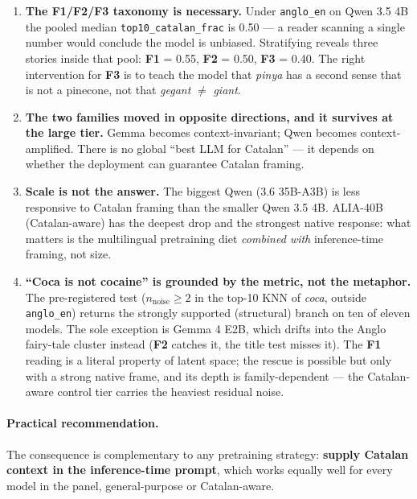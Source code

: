 \documentclass[10pt,twocolumn,a4paper]{article}
\newcommand{\code}[1]{\texttt{\small #1}}
\newcommand{\concept}[1]{\emph{#1}}
\newcommand{\Fone}{\textbf{F1}}
\newcommand{\Ftwo}{\textbf{F2}}
\newcommand{\Fthree}{\textbf{F3}}
\begin{document}
\begin{enumerate}[leftmargin=1.4em,itemsep=4pt,topsep=2pt]
  \item \textbf{The \Fone{}/\Ftwo{}/\Fthree{} taxonomy is necessary.} Under
        \code{anglo\_en} on Qwen 3.5 4B the pooled median
        \code{top10\_catalan\_frac} is 0.50 --- a reader scanning a single
        number would conclude the model is unbiased. Stratifying reveals three
        stories inside that pool: \Fone{} = 0.55, \Ftwo{} = 0.50, \Fthree{} =
        0.40. The right intervention for \Fthree{} is to teach the model that
        \concept{pinya} has a second sense that is not a pinecone, not that
        \concept{gegant} $\neq$ \emph{giant}.

  \item \textbf{The two families moved in opposite directions, and it survives
        at the large tier.} Gemma becomes context-invariant; Qwen becomes
        context-amplified. There is no global ``best LLM for Catalan'' --- it
        depends on whether the deployment can guarantee Catalan framing.

  \item \textbf{Scale is not the answer.} The biggest Qwen (3.6 35B-A3B) is
        less responsive to Catalan framing than the smaller Qwen 3.5 4B.
        ALIA-40B (Catalan-aware) has the deepest drop and the strongest native
        response: what matters is the multilingual pretraining diet
        \emph{combined with} inference-time framing, not size.

  \item \textbf{``Coca is not cocaine'' is grounded by the metric, not the
        metaphor.} The pre-registered test ($n_{\text{noise}} \geq 2$ in the
        top-10 KNN of \concept{coca}, outside \code{anglo\_en}) returns the
        strongly supported (structural) branch on ten of eleven models. The
        sole exception is Gemma 4 E2B, which drifts into the Anglo fairy-tale
        cluster instead (\Ftwo{} catches it, the title test misses it). The
        \Fone{} reading is a literal property of latent space; the rescue is
        possible but only with a strong native frame, and its depth is
        family-dependent --- the Catalan-aware control tier carries the
        heaviest residual noise.
\end{enumerate}

\paragraph{Practical recommendation.} The consequence is complementary to any
pretraining strategy: \textbf{supply Catalan context in the inference-time
prompt}, which works equally well for every model in the panel,
general-purpose or Catalan-aware.
\end{document}
